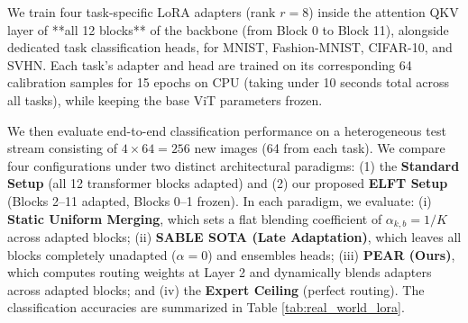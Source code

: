We train four task-specific LoRA adapters (rank $r=8$) inside the attention QKV layer of **all 12 blocks** of the backbone (from Block 0 to Block 11), alongside dedicated task classification heads, for MNIST, Fashion-MNIST, CIFAR-10, and SVHN. Each task's adapter and head are trained on its corresponding 64 calibration samples for 15 epochs on CPU (taking under 10 seconds total across all tasks), while keeping the base ViT parameters frozen.

We then evaluate end-to-end classification performance on a heterogeneous test stream consisting of $4 \times 64 = 256$ new images (64 from each task). We compare four configurations under two distinct architectural paradigms: (1) the \textbf{Standard Setup} (all 12 transformer blocks adapted) and (2) our proposed \textbf{ELFT Setup} (Blocks 2--11 adapted, Blocks 0--1 frozen). In each paradigm, we evaluate: (i) \textbf{Static Uniform Merging}, which sets a flat blending coefficient of $\alpha_{k, b} = 1/K$ across adapted blocks; (ii) \textbf{SABLE SOTA (Late Adaptation)}, which leaves all blocks completely unadapted ($\alpha = 0$) and ensembles heads; (iii) \textbf{PEAR (Ours)}, which computes routing weights at Layer 2 and dynamically blends adapters across adapted blocks; and (iv) the \textbf{Expert Ceiling} (perfect routing). The classification accuracies are summarized in Table \ref{tab:real_world_lora}.

